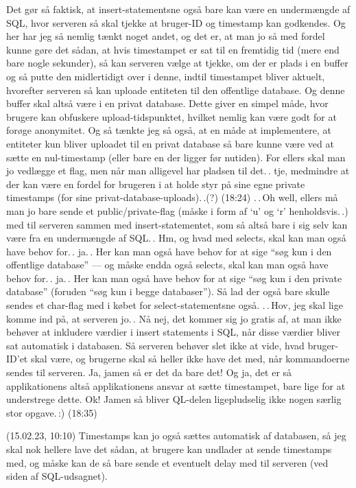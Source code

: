 \documentclass{report}
\begin{document}
Det gør så faktisk, at insert-statementsne også bare kan være en undermængde af SQL, hvor serveren så skal tjekke at bruger-ID og timestamp kan godkendes. Og her har jeg så nemlig tænkt noget andet, og det er, at man jo så med fordel kunne gøre det sådan, at hvis timestampet er sat til en fremtidig tid (mere end bare nogle sekunder), så kan serveren vælge at tjekke, om der er plads i en buffer og så putte den midlertidigt over i denne, indtil timestampet bliver aktuelt, hvorefter serveren så kan uploade entiteten til den offentlige database. Og denne buffer skal altså være i en privat database. Dette giver en simpel måde, hvor brugere kan obfuskere upload-tidspunktet, hvilket nemlig kan være godt for at forøge anonymitet. Og så tænkte jeg så også, at en måde at implementere, at entiteter kun bliver uploadet til en privat database så bare kunne være ved at sætte en nul-timestamp (eller bare en der ligger før nutiden). For ellers skal man jo vedlægge et flag, men når man alligevel har pladsen til det.\,. tje, medmindre at der kan være en fordel for brugeren i at holde styr på sine egne private timestamps (for sine privat-database-uploads).\,.(?) (18:24) .\,.\,Oh well, ellers må man jo bare sende et public/private-flag (måske i form af `u' og `r' henholdsvis.\,.) med til serveren sammen med insert-statementet, som så altså bare i sig selv kan være fra en undermængde af SQL.\,. Hm, og hvad med selects, skal kan man også have behov for.\,. ja.\,. Her kan man også have behov for at sige ``søg kun i den offentlige database'' --- og måske endda også selects, skal kan man også have behov for.\,. ja.\,. Her kan man også have behov for at sige ``søg kun i den private database'' (foruden ``søg kun i begge databaser''). Så lad der også bare skulle sendes et char-flag med i købet for select-statementsne også. .\,.\,Hov, jeg skal lige komme ind på, at serveren jo.\,. Nå nej, det kommer sig jo gratis af, at man ikke behøver at inkludere værdier i insert statements i SQL, når disse værdier bliver sat automatisk i databasen. Så serveren behøver slet ikke at vide, hvad bruger-ID'et skal være, og brugerne skal så heller ikke have det med, når kommandoerne sendes til serveren. Ja, jamen så er det da bare det! Og ja, det er så applikationens altså applikationens ansvar at sætte timestampet, bare lige for at understrege dette. Ok! Jamen så bliver QL-delen ligepludselig ikke nogen særlig stor opgave.\,:) (18:35)


(15.02.23, 10:10) Timestamps kan jo også sættes automatisk af databasen, så jeg skal nok hellere lave det sådan, at brugere kan undlader at sende timestamps med, og måske kan de så bare sende et eventuelt delay med til serveren (ved siden af SQL-udsagnet).
\end{document}
